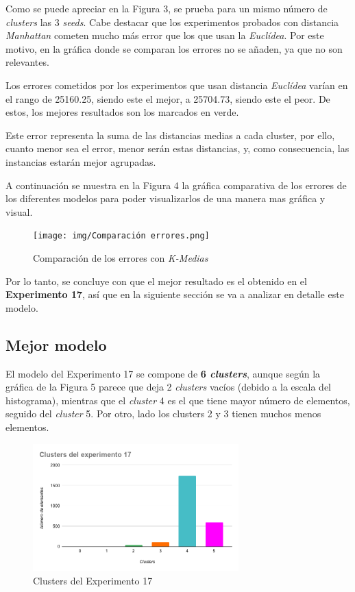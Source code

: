 \documentclass[12pt,a4paper, xcolor=table]{article}
\begin{document}
Como se puede apreciar en la Figura 3, se prueba para un mismo número de \textit{clusters} las 3 \textit{seeds}. Cabe destacar que los experimentos probados con distancia \textit{Manhattan} cometen mucho más error que los que usan la \textit{Euclídea}. Por este motivo, en la gráfica donde se comparan los errores no se añaden, ya que no son relevantes.

\vspace{2mm}

Los errores cometidos por los experimentos que usan distancia \textit{Euclídea} varían en el rango de 25160.25, siendo este el mejor, a 25704.73, siendo este el peor. De estos, los mejores resultados son los marcados en verde.

\vspace{2mm}

Este error representa la suma de las distancias medias a cada cluster, por ello, cuanto menor sea el error, menor serán estas distancias, y, como consecuencia, las instancias estarán mejor agrupadas.

\vspace{3mm}

A continuación se muestra en la Figura 4 la gráfica comparativa de los errores de los diferentes modelos para poder visualizarlos de una manera mas gráfica y visual.

\begin{figure}[!h]
    \centering
    \texttt{[image: img/Comparación errores.png]}
    \caption{Comparación de los errores con \textit{K-Medias}}
\end{figure}

Por lo tanto, se concluye con que el mejor resultado es el obtenido en el \textbf{Experimento 17}, así que en la siguiente sección se va a analizar en detalle este modelo.

\newpage

\subsection{Mejor modelo}

El modelo del Experimento 17 se compone de \textbf{6 \textit{clusters}}, aunque según la gráfica de la Figura 5 parece que deja 2 \textit{clusters} vacíos (debido a la escala del histograma), mientras que el \textit{cluster} 4 es el que tiene mayor número de elementos, seguido del \textit{cluster} 5. Por otro, lado los clusters 2 y 3 tienen muchos menos elementos.

\begin{figure}[!h]
    \centering
    \includegraphics[width=300px]{img/clusters_del_experimento_17.png}
    \caption{Clusters del Experimento 17}
\end{figure}
\end{document}
